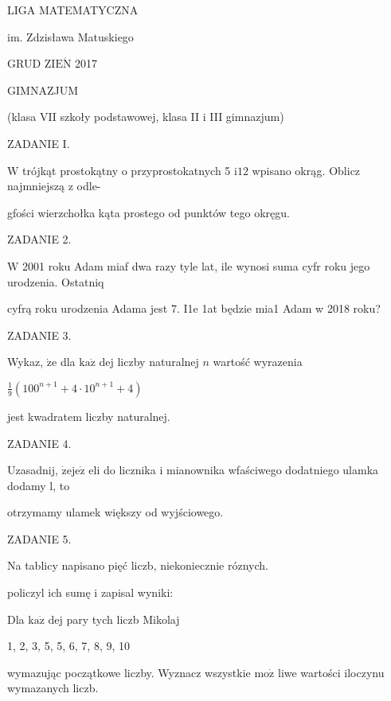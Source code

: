 \documentclass[a4paper,12pt]{article}
\begin{document}
LIGA MATEMATYCZNA

im. Zdzisława Matuskiego

GRUD Z$\mathrm{I}\mathrm{E}\acute{\mathrm{N}}$ 2017

GIMNAZJUM

(klasa VII szkoły podstawowej, klasa II i III gimnazjum)

ZADANIE I.

$\mathrm{W}$ trójkąt prostokątny o przyprostokatnych 5 $\mathrm{i}12$ wpisano okrąg. Oblicz najmniejszą z odle-

gfości wierzchołka kąta prostego od punktów tego okręgu.

ZADANIE 2.

$\mathrm{W}$ 2001 roku Adam miaf dwa razy tyle lat, ile wynosi suma cyfr roku jego urodzenia. Ostatniq

cyfrą roku urodzenia Adama jest 7. I1e 1at będzie mia1 Adam w 2018 roku?

ZADANIE 3.

Wykaz, $\dot{\mathrm{z}}\mathrm{e}$ dla $\mathrm{k}\mathrm{a}\dot{\mathrm{z}}$ dej liczby naturalnej $n$ wartość wyrazenia

$\displaystyle \frac{1}{9}(100^{n+1}+4\cdot 10^{n+1}+4)$

jest kwadratem liczby naturalnej.

ZADANIE 4.

Uzasadnij, $\dot{\mathrm{z}}\mathrm{e}\mathrm{j}\mathrm{e}\dot{\mathrm{z}}$ eli do licznika i mianownika wfaściwego dodatniego ulamka dodamy l, to

otrzymamy ulamek większy od wyjściowego.

ZADANIE 5.

Na tablicy napisano pięć liczb, niekoniecznie róznych.

policzyl ich sumę i zapisal wyniki:

Dla $\mathrm{k}\mathrm{a}\dot{\mathrm{z}}$ dej pary tych liczb Mikolaj

1, 2, 3, 5, 5, 6, 7, 8, 9, 10

wymazując początkowe liczby. Wyznacz wszystkie $\mathrm{m}\mathrm{o}\dot{\mathrm{z}}$ liwe wartości iloczynu wymazanych liczb.
\end{document}

